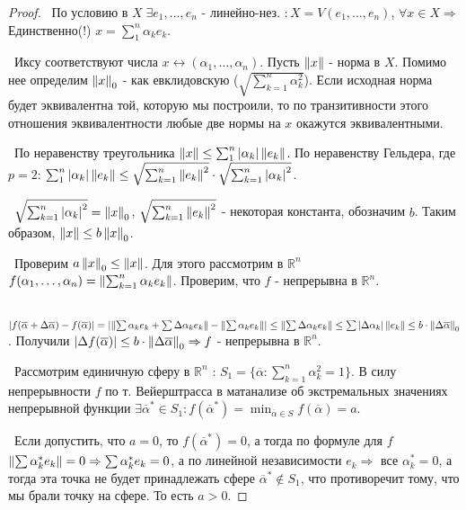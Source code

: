 \begin{proof}

\noindent \textbullet~По условию в $X \; \exists e_1, \dots, e_n$ - линейно-нез. $: X = V(e_1, \dots, e_n)$, $\forall x \in X \Rightarrow$ Единственно($!$) $x = \sum_1^n 
\alpha_k e_k$.

\smallskip
\noindent \textbullet~Иксу соответствуют числа $x \leftrightarrow (\alpha_1, \dots, \alpha_n)$. Пусть $\left\lVert x\right\rVert$ - норма в $X$. Помимо нее определим $\left\lVert x\right\rVert_0$ -
как евклидовскую ($\sqrt{\sum_{k = 1} ^n \alpha_k^2}$).
Если исходная норма будет эквивалентна той, которую мы построили, то по транзитивности этого отношения эквивалентности любые две нормы на $x$ 
окажутся эквивалентными.

\smallskip 
\noindent \textbullet~По неравенству треугольника $\left\lVert x\right\rVert \le \sum_1^n \left\lvert\alpha_k\right\rvert \left\lVert e_k\right\rVert$. По неравенству Гельдера, где $p = 2$: 
$\sum_1^n \left\lvert\alpha_k\right\rvert \left\lVert e_k\right\rVert \le \sqrt{\sum_{k = 1}^{n} \left\lVert e_k\right\rVert^2} \cdot \sqrt{\sum_{k = 1}^n \left\lvert\alpha_k\right\rvert^2}$. 

\smallskip
\noindent \textbullet~$\sqrt{\sum_{k = 1}^n \left\lvert\alpha_k\right\rvert^2} = \left\lVert x\right\rVert_0$, $ \sqrt{\sum_{k = 1}^{n} \left\lVert e_k\right\rVert^2}$ - некоторая константа, обозначим $b$. Таким образом,
$\left\lVert x\right\rVert \le b \left\lVert x\right\rVert_0$.

\medskip 
\noindent \textbullet~Проверим $a \left\lVert x\right\rVert_0 \le \left\lVert x\right\rVert$. Для этого рассмотрим в $\mathbb{R}^n$ $f(\alpha_1, \dots, \alpha_n) = \left\lVert\sum_{k = 1}^n \alpha_k e_k\right\rVert$.
Проверим, что $f$ - непрерывна в $\mathbb{R}^n$.

\smallskip
\noindent \textbullet~$\left\lvert f(\overline{\alpha} + \Delta \overline{\alpha}) - f(\overline{\alpha})\right\rvert = \left\lvert\left\lVert\sum \alpha_k e_k + \sum \Delta\alpha_k e_k\right\rVert - 
\left\lVert\sum \alpha_k e_k\right\rVert\right\rvert \le \left\lVert\sum \Delta \alpha_k e_k\right\rVert \le \sum \left\lvert\Delta \alpha_k\right\rvert \left\lVert e_k\right\rVert \le b \cdot \left\lVert\Delta \overline{\alpha}\right\rVert_0$.
Получили $\left\lvert\Delta f(\overline{\alpha})\right\rvert \le b \cdot \left\lVert\Delta \overline{\alpha}\right\rVert_0 \Rightarrow f$ - непрерывна в $\mathbb{R}^n$.

\smallskip 
\noindent \textbullet~Рассмотрим единичную сферу в $\mathbb{R}^n$ : $S_1 = \{ \overline{\alpha} : \sum_{k = 1}^n \alpha_k^2 = 1\}$. В силу непрерывности $f$ по 
т. Вейерштрасса в матанализе об экстремальных значениях непрерывной функции $\exists \overline{\alpha}^* \in S_1 : f(\overline{\alpha}^*) = 
\min_{\overline{\alpha } \in S} f(\overline{\alpha}) = a$.

\smallskip 
\noindent \textbullet~Если допустить, что $a = 0$, то $f(\overline{\alpha}^*) = 0$, а тогда по формуле для $f$ $\left\lVert\sum \alpha^*_k e_k\right\rVert = 0 \Rightarrow
\sum \alpha^*_{k} e_k = 0$, а по линейной независимости $e_k \Rightarrow$ все $\alpha_k^* = 0$, а тогда эта точка не будет принадлежать сфере $\overline{\alpha}^* \notin
S_1$, что противоречит тому, что мы брали точку на сфере. То есть $a > 0$.


\end{proof}
